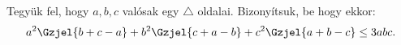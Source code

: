 Tegyük fel, hogy $a,b,c$ valósak egy $\triangle$ oldalai. Bizonyítsuk, be 
hogy ekkor:
$$
a^{2}\Gzjel{b+c-a}+b^{2}\Gzjel{c+a-b}+c^{2}\Gzjel{a+b-c} \le 3abc.
$$
